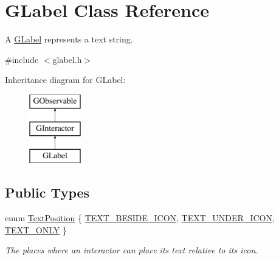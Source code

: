 \hypertarget{classsgl_1_1GLabel}{}\section{G\+Label Class Reference}
\label{classsgl_1_1GLabel}


A \mbox{\hyperlink{classsgl_1_1GLabel}{G\+Label}} represents a text string.  




{\ttfamily \#include $<$glabel.\+h$>$}

Inheritance diagram for G\+Label\+:\begin{figure}[H]
\begin{center}
\leavevmode
\includegraphics[height=3.000000cm]{classsgl_1_1GLabel}
\end{center}
\end{figure}
\subsection*{Public Types}
\begin{DoxyCompactItemize}
\item 
enum \mbox{\hyperlink{classsgl_1_1GInteractor_a8e0d441725a81d2bbdebbea09078260e}{Text\+Position}} \{ \mbox{\hyperlink{classsgl_1_1GInteractor_a8e0d441725a81d2bbdebbea09078260ea4cd6f2e7d5a08d6f4dc052df2358f774}{T\+E\+X\+T\+\_\+\+B\+E\+S\+I\+D\+E\+\_\+\+I\+C\+ON}}, 
\mbox{\hyperlink{classsgl_1_1GInteractor_a8e0d441725a81d2bbdebbea09078260eaa88490f63d8de68d44c83bdb2ecde3b3}{T\+E\+X\+T\+\_\+\+U\+N\+D\+E\+R\+\_\+\+I\+C\+ON}}, 
\mbox{\hyperlink{classsgl_1_1GInteractor_a8e0d441725a81d2bbdebbea09078260ea39a6f388a30ac4fefb6eb13e846bc9f2}{T\+E\+X\+T\+\_\+\+O\+N\+LY}}
 \}
\begin{DoxyCompactList}\small\item\em The places where an interactor can place its text relative to its icon. \end{DoxyCompactList}\end{DoxyCompactItemize}
